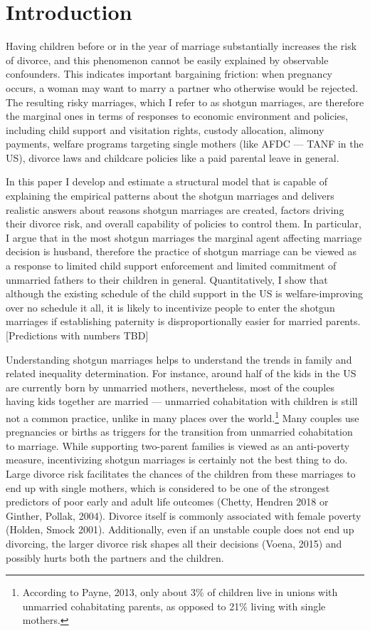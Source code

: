 \documentclass[12pt,letter]{article}
\begin{document}
\section{Introduction}

Having children before or in the year of marriage substantially increases the risk of divorce, and this phenomenon cannot be easily explained by observable confounders. This indicates important bargaining friction: when pregnancy occurs, a woman may want to marry a partner who otherwise would be rejected. The resulting risky marriages, which I refer to as shotgun marriages, are therefore the marginal ones in terms of responses to economic environment and policies, including child support and visitation rights, custody allocation, alimony payments, welfare programs targeting single mothers (like AFDC — TANF in the US), divorce laws and childcare policies like a paid parental leave in general. 

In this paper I develop and estimate a structural model that is capable of explaining the empirical patterns about the shotgun marriages and delivers realistic answers about reasons shotgun marriages are created, factors driving their divorce risk, and overall capability of policies to control them. In particular, I argue that in the most shotgun marriages the marginal agent affecting marriage decision is husband, therefore the practice of shotgun marriage can be viewed as a response to limited child support enforcement and limited commitment of unmarried fathers to their children in general. Quantitatively, I show that although the existing schedule of the child support in the US is welfare-improving over no schedule it all, it is likely to incentivize people to enter the shotgun marriages if establishing paternity is disproportionally easier for married parents. [Predictions with numbers TBD]

Understanding shotgun marriages helps to understand the trends in family and related inequality determination. For instance, around half of the kids in the US are currently born by unmarried mothers, nevertheless, most of the couples having kids together are married --- unmarried cohabitation with children is still not a common practice, unlike in many places over the world.\footnote{According to Payne, 2013, only about 3\% of children live in unions with unmarried cohabitating parents, as opposed to 21\% living with single mothers.} Many couples use pregnancies or births as triggers for the transition from unmarried cohabitation to marriage.  While supporting two-parent families is viewed as an anti-poverty measure, incentivizing shotgun marriages is certainly not the best thing to do. Large divorce risk facilitates the chances of the children from these marriages to end up with single mothers, which is considered to be one of the strongest predictors of poor early and adult life outcomes (Chetty, Hendren 2018 or Ginther, Pollak, 2004). Divorce itself is commonly associated with female poverty (Holden, Smock 2001). Additionally, even if an unstable couple does not end up divorcing, the larger divorce risk shapes all their decisions (Voena, 2015) and possibly hurts both the partners and the children.
\end{document}

